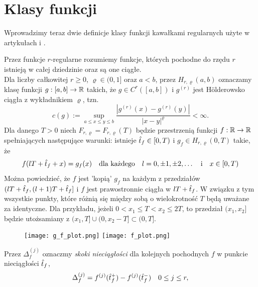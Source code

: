 \documentclass[oik, pdftex, man]{mgrwms}
\begin{document}
\section{Klasy funkcji} \label{rozdzial:klasy_funkcji}

    Wprowadzimy teraz dwie definicje klasy funkcji kawałkami regularnych użyte w artykułach \cite{CoDF} i \cite{AoP}. 

    Przez funkcje $r$-regularne rozumiemy funkcje, których pochodne do rzędu $r$ istnieją w całej dziedzinie oraz są one ciągłe. \\
    Dla liczby całkowitej $ r \geq 0$, $\varrho \in (0,1]$ oraz $a < b$, przez $H_{r, \varrho}(a,b)$ oznaczamy klasę funkcji $g: [a,b] \rightarrow \mathbb{R}$ takich, że $g \in C^r([a, b])$ i $g^{(r)}$ jest Hölderowsko ciągła z wykładnikiem $\varrho$, tzn.
    \begin{equation*}
        c(g) := \sup_{a \leq x \leq y \leq b} \frac{|g^{(r)}(x) - g^{(r)}(y)|}{|x-y|^{\varrho}} < \infty.
    \end{equation*}
    Dla danego $T > 0$ niech $F_{r, \varrho} = F_{r, \varrho}(T)$ będzie przestrzenią funkcji $f: \mathbb{R} \rightarrow \mathbb{R}$ spełniających następujące warunki: istnieje $\hat{t}_{f} \in [0, T)$ i $g_f \in H_{r, \varrho}(0,T)$ takie, że
    \begin{equation*}
        f(lT + \hat{t}_f + x) = g_f(x) \quad \text{dla każdego} \quad l = 0, \pm 1, \pm 2, \ldots \quad \text{i} \quad x \in [0, T)
    \end{equation*}
    Można powiedzieć, że $f$ jest 'kopią' $g_f$ na każdym z przedziałów $(lT + \hat{t}_f, (l + 1)T + \hat{t}_f]$ i $f$ jest prawostronnie ciągła w $lT + \hat{t}_f$. W związku z tym wszystkie punkty, które różnią się między sobą o wielokrotność $T$ będą uważane za identyczne. Dla przykładu, jeżeli $0 < x_1 \leq T < x_2 \leq 2T$, to przedział $(x_1, x_2]$ będzie utożsamiany z $(x_1,T] \cup (0, x_2 - T] \subset (0, T]$.

    \begin{figure}[h!]
        \texttt{[image: g\_f\_plot.png]}
        \texttt{[image: f\_plot.png]}
    \end{figure}


    Przez $\Delta_f^{(j)}$ oznaczmy \emph{skoki nieciągłości} dla kolejnych pochodnych $f$ w punkcie nieciągłości $\hat{t}_f$,
    \begin{equation*}
        \Delta_f^{(j)} = f^{(j)}(\hat{t}_f^+) - f^{(j)}(\hat{t}_f^-) \quad 0 \leq j \leq r,
    \end{equation*}
\end{document}
